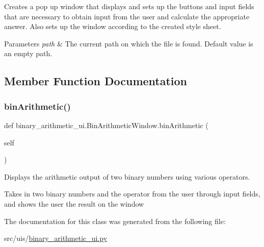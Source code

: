 Creates a pop up window that displays and sets up the buttons and input fields that are necessary to obtain input from the user and calculate the appropriate answer. Also sets up the window according to the created style sheet. 
\begin{DoxyParams}{Parameters}
{\em path} & The current path on which the file is found. Default value is an empty path. \\
\hline
\end{DoxyParams}


\subsection{Member Function Documentation}
\mbox{\label{classbinary__arithmetic__ui_1_1_bin_arithmetic_window_ae3a5ab3baee92929acc1ee524456825a}} 
\subsubsection{\texorpdfstring{bin\+Arithmetic()}{binArithmetic()}}
{\footnotesize\ttfamily def binary\+\_\+arithmetic\+\_\+ui.\+Bin\+Arithmetic\+Window.\+bin\+Arithmetic (\begin{DoxyParamCaption}\item[{}]{self }\end{DoxyParamCaption})}



Displays the arithmetic output of two binary numbers using various operators. 

Takes in two binary numbers and the operator from the user through input fields, and shows the user the result on the window 

The documentation for this class was generated from the following file\+:\begin{DoxyCompactItemize}
\item 
src/uis/\hyperlink{binary__arithmetic__ui_8py}{binary\+\_\+arithmetic\+\_\+ui.\+py}\end{DoxyCompactItemize}
